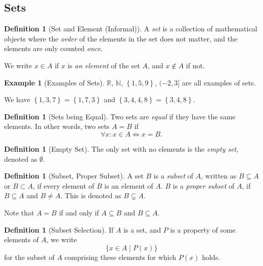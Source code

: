 \documentclass{article}
\theoremstyle{definition}
\newtheorem{definition}[theorem]{Definition}
\newtheorem{example}[theorem]{Example}
\theoremstyle{remark}
\newcommand{\pqty}[1]{\left(#1\right)}
\newcommand{\Bqty}[1]{\left\{#1\right\}}
\newcommand{\set}[2]{\{#1\mid #2\}}
\newcommand{\ocintv}[2]{(#1,#2]}
\newcommand{\NN}{\mathbb{N}}
\newcommand{\RR}{\mathbb{R}}
\begin{document}
\subsection{Sets}
\label{sec:sets}

\begin{definition}[Set and Element (Informal)]
    A \emph{set} is a collection of mathematical objects where the \emph{order} of the elements in the set does not matter, and the elements are only counted \emph{once}.

    We write \(x \in A\) if \(x\) is \emph{an element} of the set \(A\), and \(x \notin A\) if not.
\end{definition}

\begin{example}[Examples of Sets]
    \(\RR\), \(\NN\), \(\Bqty{1, 5, 9}\), \(\ocintv{-2}{3}\) are all examples of sets.
    
    We have \(\Bqty{1, 3, 7} = \Bqty{1, 7, 3}\) and \(\Bqty{3, 4, 4, 8} = \Bqty{3, 4, 8}\).
\end{example}

\begin{definition}[Sets being Equal]
    Two sets are \emph{equal} if they have the same elements. In other words, two sets \(A = B\) if
    \[
        \forall x: x \in A \iff x = B.
    \]
\end{definition}

\begin{definition}[Empty Set]
    The only set with no elements is the \emph{empty set}, denoted as \(\emptyset\).
\end{definition}

\begin{definition}[Subset, Proper Subset]
    A set \(B\) is a \emph{subset} of \(A\), written as \(B \subseteq A\) or \(B \subset A\), if every element of \(B\) is an element of \(A\). \(B\) is a \emph{proper subset} of \(A\), if \(B \subseteq A\) and \(B \neq A\). This is denoted as \(B \subsetneq A\).
\end{definition}

Note that \(A = B\) if and only if \(A \subseteq B\) and \(B \subseteq A\).

\begin{definition}[Subset Selection]
    If \(A\) is a set, and \(P\) is a property of some elements of \(A\), we write
    \[
        \set{x \in A}{P\pqty{x}}
    \]
    for the subset of \(A\) comprising these elements for which \(P\pqty{x}\) holds.
\end{definition}
\end{document}
